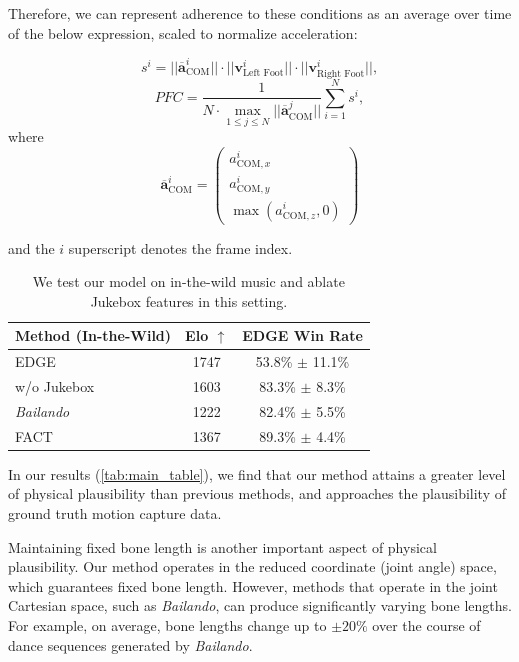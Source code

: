 \documentclass[10pt,twocolumn,letterpaper]{article}
\begin{document}
Therefore, we can represent adherence to these conditions as an average over time of the below expression, scaled to normalize acceleration:

\begin{equation} \label{eq:9}
{
s^i = ||\overline{\bm{a}}^i_{\text{COM}}|| \cdot ||\mathbf{v}^i_{\text{Left Foot}}|| \cdot ||\mathbf{v}^i_{\text{Right Foot}}||
},
\end{equation}
\begin{equation} \label{eq:10}
{
PFC = \frac{1}{N \cdot \max\limits_{1\leq j \leq N} ||\bm{\overline{a}}^{j}_{\text{COM}}||} \sum_{i=1}^{N} s^i
},
\end{equation}
where  $$\overline{\bm{a}}_{\text{COM}}^i = \begin{pmatrix} a_{\text{COM},x}^i \\ a_{\text{COM},y}^i \\ \max(a_{\text{COM},z}^i, 0) \end{pmatrix}$$

and the $i$ superscript denotes the frame index.

\begin{table}
  \centering
  \begin{tabular}{lcc}
    \toprule
    Method (In-the-Wild) & Elo $\uparrow$ & EDGE Win Rate \\
    \midrule EDGE & 1747 & 53.8\% $\pm$ 11.1\% \\
    \hspace{4pt} w/o Jukebox & 1603 & 83.3\% $\pm$ 8.3\% \\
    \textit{Bailando} & 1222 & 82.4\% $\pm$ 5.5\% \\
    FACT & 1367 & 89.3\% $\pm$ 4.4\% \\
    \bottomrule
    \end{tabular}
    \caption{We test our model on in-the-wild music and ablate Jukebox features in this setting.}
    \label{tab:ood_table}
\end{table}

In our results (\cref{tab:main_table}), we find that our method attains a greater level of physical plausibility than previous methods, and approaches the plausibility of ground truth motion capture data.

Maintaining fixed bone length is another important aspect of physical plausibility.
Our method operates in the reduced coordinate (joint angle) space, which guarantees fixed bone length. However, methods that operate in the joint Cartesian space, such as \emph{Bailando}, can produce significantly varying bone lengths.
For example, on average, bone lengths change up to $\pm20\%$ over the course of dance sequences generated by \textit{Bailando}.
\end{document}
